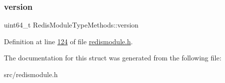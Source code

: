 \subsubsection{\texorpdfstring{version}{version}}
{\footnotesize\ttfamily uint64\+\_\+t Redis\+Module\+Type\+Methods\+::version}



Definition at line \hyperlink{redismodule_8h_source_l00124}{124} of file \hyperlink{redismodule_8h_source}{redismodule.\+h}.



The documentation for this struct was generated from the following file\+:\begin{DoxyCompactItemize}
\item 
src/redismodule.\+h\end{DoxyCompactItemize}
